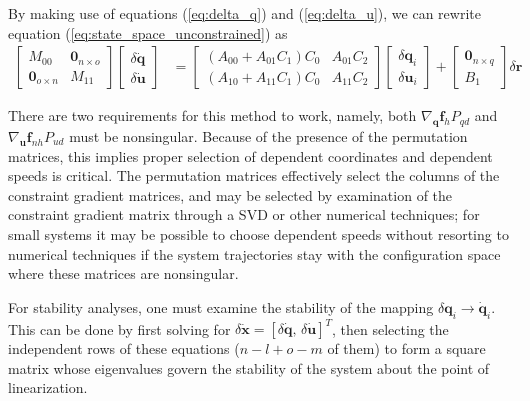 \documentclass{svjour3}                     %
\begin{document}
By making use of equations (\ref{eq:delta_q}) and (\ref{eq:delta_u}), we can
rewrite equation (\ref{eq:state_space_unconstrained}) as
\begin{align}
  \label{eq:state_space_constrained}
  \left[
    \begin{array}{cc}
      M_{00} & \bm{0}_{n \times o} \\
      \bm{0}_{o \times n} & M_{11}
    \end{array}
    \right]
    \left[
      \begin{array}{c}
        \delta \bm{\dot{q}} \\
        \delta \bm{\dot{u}}
      \end{array}
    \right]
   &=
   \left[
     \begin{array}{cc}
       (A_{00} + A_{01} C_{1}) C_{0} & A_{01} C_{2} \\
       (A_{10} + A_{11} C_{1}) C_{0} & A_{11} C_{2}
     \end{array}
   \right]
    \left[
      \begin{array}{c}
        \delta \bm{q}_i \\
        \delta \bm{u}_i
      \end{array}
    \right]
    +
    \left[
      \begin{array}{c}
        \bm{0}_{n \times q} \\
        B_{1}
      \end{array}
    \right]
    \delta \bm{r}
\end{align}

There are two requirements for this method to work, namely, both
$\nabla_{\bm{q}}\bm{f}_{h} P_{qd}$ and $\nabla_{\bm{u}} \bm{f}_{nh} P_{ud}$
must be nonsingular.  Because of the presence of the permutation matrices, this
implies proper selection of dependent coordinates and dependent speeds is
critical.  The permutation matrices effectively select the columns of the
constraint gradient matrices, and may be selected by examination of the
constraint gradient matrix through a SVD or other numerical techniques; for
small systems it may be possible to choose dependent speeds without resorting
to numerical techniques if the system trajectories stay with the configuration
space where these matrices are nonsingular.

For stability analyses, one must examine the stability of the mapping $\delta
\bm{q}_i \to \bm{\dot{q}}_i$.  This can be done by first solving for
$\delta\bm{\dot{x}} = \left[\delta\bm{\dot{q}},\,\delta\bm{\dot{u}}\right]^{T}$, then selecting
the independent rows of these equations ($n-l+o-m$ of them) to form a square
matrix whose eigenvalues govern the stability of the system about the point of
linearization.
\end{document}
